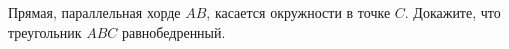 \begin{ex}
	\begin{condition}
		Прямая, параллельная хорде \( AB \), касается окружности в точке \( C \). Докажите, что треугольник \( ABC  \) равнобедренный.
	\end{condition}
\end{ex}